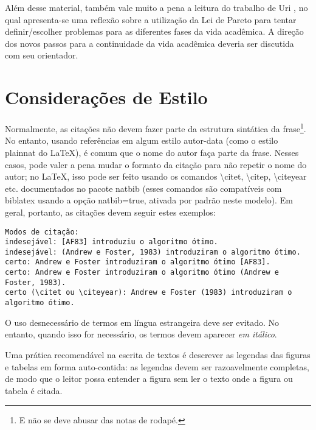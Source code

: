 Além desse material, também vale muito a pena a leitura do trabalho de
Uri \citet{alon09:how}, %
no qual apresenta-se uma reflexão sobre a utilização da Lei de Pareto para
tentar definir/escolher problemas para as diferentes fases da vida acadêmica.
A direção dos novos passos para a continuidade da vida acadêmica deveria ser
discutida com seu orientador.

\section{Considerações de Estilo}
\label{sec:consideracoes_preliminares}

Normalmente, as citações não devem fazer parte da estrutura sintática da
frase\footnote{E não se deve abusar das notas de rodapé.}.
No entanto, usando referências em algum estilo autor-data (como o estilo
plainnat do \LaTeX{}), é comum que o nome do autor faça parte da frase. Nesses
casos, pode valer a pena mudar o formato da citação para não repetir o nome do
autor; no \LaTeX{}, isso pode ser feito usando os comandos
\textsf{\textbackslash{}citet}, \textsf{\textbackslash{}citep},
\textsf{\textbackslash{}citeyear} etc. documentados no pacote
natbib \citep{natbib} (esses comandos são compatíveis com biblatex
usando a opção \textsf{natbib=true}, ativada por padrão neste modelo). Em geral,
portanto, as citações devem seguir estes exemplos:

\small
\begin{verbatim}
Modos de citação:
indesejável: [AF83] introduziu o algoritmo ótimo.
indesejável: (Andrew e Foster, 1983) introduziram o algoritmo ótimo.
certo: Andrew e Foster introduziram o algoritmo ótimo [AF83].
certo: Andrew e Foster introduziram o algoritmo ótimo (Andrew e Foster, 1983).
certo (\citet ou \citeyear): Andrew e Foster (1983) introduziram o algoritmo ótimo.
\end{verbatim}
\normalsize

O uso desnecessário de termos em língua estrangeira deve ser evitado. No entanto,
quando isso for necessário, os termos devem aparecer \textit{em itálico}.

Uma prática recomendável na escrita de textos é descrever as
legendas das figuras e tabelas em forma auto-contida: as
legendas devem ser razoavelmente completas, de modo que o leitor possa entender
a figura sem ler o texto onde a figura ou tabela é citada.

